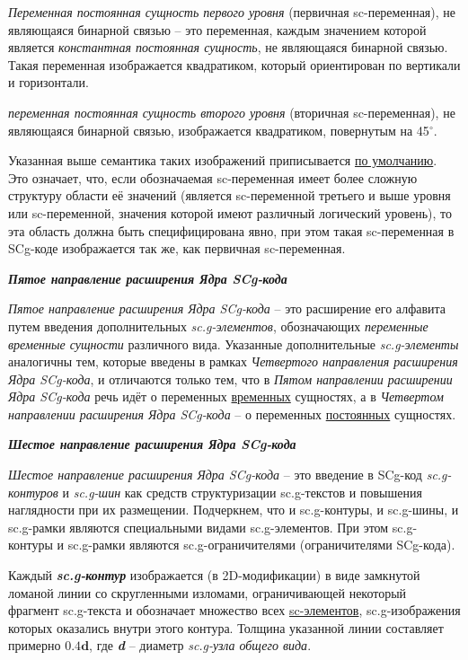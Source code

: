\textit{Переменная постоянная сущность первого уровня } (первичная sc-переменная), не являющаяся бинарной связью -- это переменная, каждым значением которой является \textit{константная постоянная сущность}, не являющаяся бинарной связью. Такая переменная изображается квадратиком, который ориентирован по вертикали и горизонтали. 

\textit{переменная постоянная сущность второго уровня} (вторичная sc-переменная), не являющаяся бинарной связью, изображается квадратиком, повернутым на 45$^\circ$. 

Указанная выше семантика таких изображений приписывается \uline{по умолчанию}. Это означает, что, если обозначаемая sc-переменная имеет более сложную структуру области её значений (является sc-переменной третьего и выше уровня или sc-переменной, значения которой имеют различный логический уровень), то эта область должна быть специфицирована явно, при этом такая sc-переменная в SCg-коде изображается так же, как первичная sc-переменная.



\textbf{\textit{Пятое направление расширения Ядра SCg-кода}}
	
\textit{Пятое направление расширения Ядра SCg-кода} -- это расширение его алфавита путем введения дополнительных \textit{sc.g-элементов}, обозначающих \textit{переменные временные сущности} различного вида. Указанные дополнительные \textit{sc.g-элементы} аналогичны тем, которые введены в рамках \textit{Четвертого направления расширения Ядра SCg-кода}, и отличаются только тем, что в \textit{Пятом направлении расширении Ядра SCg-кода} речь идёт о переменных \uline{временных} сущностях, а в \textit{Четвертом направлении расширения Ядра SCg-кода} -- о переменных \uline{постоянных} сущностях.


\textbf{\textit{Шестое направление расширения Ядра SCg-кода}}

\textit{Шестое направление расширения Ядра SCg-кода} -- это введение в SCg-код \textit{sc.g-контуров} и \textit{sc.g-шин} как средств структуризации sc.g-текстов и повышения наглядности при их размещении. Подчеркнем, что и sc.g-контуры, и sc.g-шины, и sc.g-рамки являются специальными видами sc.g-элементов. При этом sc.g-контуры и sc.g-рамки являются sc.g-ограничителями (ограничителями SCg-кода).

Каждый \textbf{\textit{sc.g-контур}} изображается (в 2D-модификации) в виде замкнутой ломаной линии со скругленными изломами, ограничивающей некоторый фрагмент sc.g-текста и обозначает множество всех \uline{sc-элементов}, sc.g-изображения которых оказались внутри этого контура. Толщина указанной линии составляет примерно $\bm{0.4d}$, где \textbf{\textit{d}} -- диаметр \textit{sc.g-узла общего вида}.


